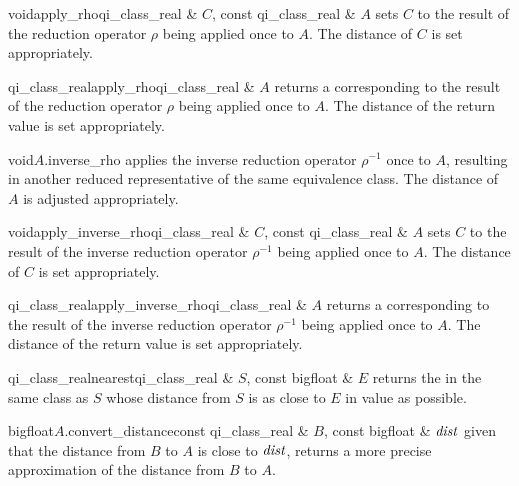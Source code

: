 \begin{fcode}{void}{apply_rho}{qi_class_real & $C$, const qi_class_real & $A$}
  sets $C$ to the result of the reduction operator $\rho$ being applied once to $A$.  The
  distance of $C$ is set appropriately.
\end{fcode}

\begin{fcode}{qi_class_real}{apply_rho}{qi_class_real & $A$}
  returns a  corresponding to the result of the reduction operator $\rho$
  being applied once to $A$.  The distance of the return value is set appropriately.
\end{fcode}

\begin{fcode}{void}{$A$.inverse_rho}{}
  applies the inverse reduction operator $\rho^{-1}$ once to $A$, resulting in another reduced
  representative of the same equivalence class.  The distance of $A$ is adjusted appropriately.
\end{fcode}

\begin{fcode}{void}{apply_inverse_rho}{qi_class_real & $C$, const qi_class_real & $A$}
  sets $C$ to the result of the inverse reduction operator $\rho^{-1}$ being applied once to $A$.
  The distance of $C$ is set appropriately.
\end{fcode}

\begin{fcode}{qi_class_real}{apply_inverse_rho}{qi_class_real & $A$}
  returns a  corresponding to the result of the inverse reduction operator
  $\rho^{-1}$ being applied once to $A$.  The distance of the return value is set appropriately.
\end{fcode}

\begin{fcode}{qi_class_real}{nearest}{qi_class_real & $S$, const bigfloat & $E$}
  returns the  in the same class as $S$ whose distance from $S$ is as close
  to $E$ in value as possible.
\end{fcode}

\begin{cfcode}{bigfloat}{$A$.convert_distance}{const qi_class_real & $B$,
    const bigfloat & $\mathit{dist}$}%
  given that the distance from $B$ to $A$ is close to $\mathit{dist}$, returns a more precise
  approximation of the distance from $B$ to $A$.
\end{cfcode}



